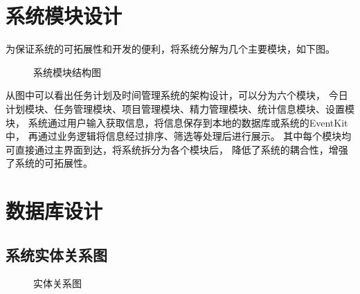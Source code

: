 \section{系统模块设计}
为保证系统的可拓展性和开发的便利，将系统分解为几个主要模块，如下图。
\begin{figure}[H]
	\centering
	\caption{系统模块结构图}
    \label{fig:part}
\end{figure}

从图中可以看出任务计划及时间管理系统的架构设计，可以分为六个模块，
今日计划模块、任务管理模块、项目管理模块、精力管理模块、统计信息模块、设置模块，
系统通过用户输入获取信息，将信息保存到本地的数据库或系统的EventKit中，
再通过业务逻辑将信息经过排序、筛选等处理后进行展示。
其中每个模块均可直接通过主界面到达，将系统拆分为各个模块后，
降低了系统的耦合性，增强了系统的可拓展性。

\section{数据库设计}

\subsection{系统实体关系图}
\begin{figure}[H]
	\centering
	\caption{实体关系图}
    \label{fig:e-r}
\end{figure}


